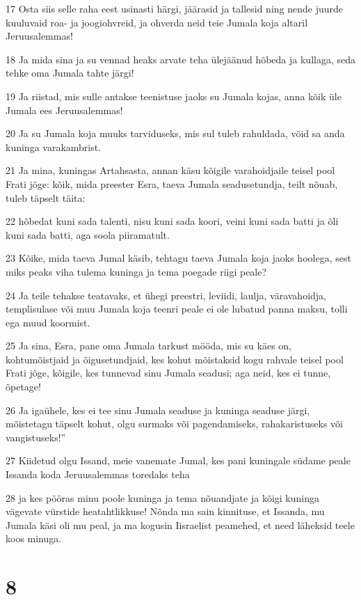 \par 17 Osta siis selle raha eest usinasti härgi, jäärasid ja tallesid ning nende juurde kuuluvaid roa- ja joogiohvreid, ja ohverda neid teie Jumala koja altaril Jeruusalemmas!
\par 18 Ja mida sina ja su vennad heaks arvate teha ülejäänud hõbeda ja kullaga, seda tehke oma Jumala tahte järgi!
\par 19 Ja riistad, mis sulle antakse teenistuse jaoks su Jumala kojas, anna kõik üle Jumala ees Jeruusalemmas!
\par 20 Ja su Jumala koja muuks tarviduseks, mis sul tuleb rahuldada, võid sa anda kuninga varakambrist.
\par 21 Ja mina, kuningas Artahsasta, annan käsu kõigile varahoidjaile teisel pool Frati jõge: kõik, mida preester Esra, taeva Jumala seadusetundja, teilt nõuab, tuleb täpselt täita:
\par 22 hõbedat kuni sada talenti, nisu kuni sada koori, veini kuni sada batti ja õli kuni sada batti, aga soola piiramatult.
\par 23 Kõike, mida taeva Jumal käsib, tehtagu taeva Jumala koja jaoks hoolega, sest miks peaks viha tulema kuninga ja tema poegade riigi peale?
\par 24 Ja teile tehakse teatavaks, et ühegi preestri, leviidi, laulja, väravahoidja, templisulase või muu Jumala koja teenri peale ei ole lubatud panna maksu, tolli ega muud koormist.
\par 25 Ja sina, Esra, pane oma Jumala tarkust mööda, mis su käes on, kohtumõistjaid ja õigusetundjaid, kes kohut mõistaksid kogu rahvale teisel pool Frati jõge, kõigile, kes tunnevad sinu Jumala seadusi; aga neid, kes ei tunne, õpetage!
\par 26 Ja igaühele, kes ei tee sinu Jumala seaduse ja kuninga seaduse järgi, mõistetagu täpselt kohut, olgu surmaks või pagendamiseks, rahakaristuseks või vangistuseks!”
\par 27 Kiidetud olgu Issand, meie vanemate Jumal, kes pani kuningale südame peale Issanda koda Jeruusalemmas toredaks teha
\par 28 ja kes pööras minu poole kuninga ja tema nõuandjate ja kõigi kuninga vägevate vürstide heatahtlikkuse! Nõnda ma sain kinnituse, et Issanda, mu Jumala käsi oli mu peal, ja ma kogusin Iisraelist peamehed, et need läheksid teele koos minuga.

\chapter{8}

